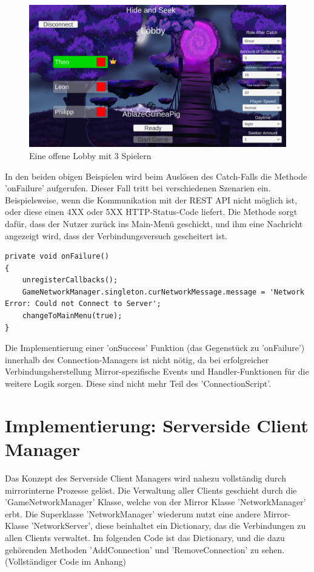 \begin{figure}[H]
	\centering
	\includegraphics[width=120mm]{images/prototyp_lobby_menu.png}
	\caption[Prototyp Lobby Menu]{Eine offene Lobby mit 3 Spielern}
	\label{pic:prototyp_lobby_menu}
\end{figure}

In den beiden obigen Beispielen wird beim Auslösen des Catch-Falls die Methode 'onFailure' aufgerufen. Dieser Fall tritt bei verschiedenen Szenarien ein. Beispielsweise, wenn die Kommunikation mit der REST API nicht möglich ist, oder diese einen 4XX oder 5XX HTTP-Status-Code liefert. Die Methode sorgt dafür, dass der Nutzer zurück ins Main-Menü geschickt, und ihm eine Nachricht angezeigt wird, dass der Verbindungsversuch gescheitert ist.

\begin{lstlisting}[caption= ConnectionScript.cs onFailure()]
private void onFailure()
{
	unregisterCallbacks();
	GameNetworkManager.singleton.curNetworkMessage.message = 'Network Error: Could not Connect to Server';
	changeToMainMenu(true);
}

\end{lstlisting}

Die Implementierung einer 'onSuccess' Funktion (das Gegenstück zu 'onFailure') innerhalb des Connection-Managers ist nicht nötig, da bei erfolgreicher Verbindungsherstellung Mirror-spezifische Events und Handler-Funktionen für die weitere Logik sorgen. Diese sind nicht mehr Teil des 'ConnectionScript'.

\section{Implementierung: Serverside Client Manager}

Das Konzept des Serverside Client Managers wird nahezu vollständig durch mirrorinterne Prozesse gelöst. Die Verwaltung aller Clients geschieht durch die 'GameNetworkManager' Klasse, welche von der Mirror Klasse 'NetworkManager' erbt. Die Superklasse 'NetworkManager' wiederum nutzt eine andere Mirror-Klasse 'NetworkServer', diese beinhaltet ein Dictionary, das die Verbindungen zu allen Clients verwaltet. Im folgenden Code ist das Dictionary, und die dazu gehörenden Methoden 'AddConnection' und 'RemoveConnection' zu sehen. (Vollständiger Code im Anhang)

